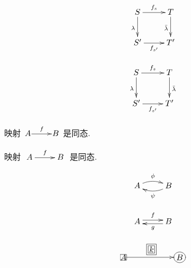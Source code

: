 \documentclass{ctexart}
\begin{document}






\begin{equation}
\begin{gathered}
\xymatrix{
S\ar[r]^{f_s} \ar[d]_{\lambda} & T\ar[d]_{\bar{\lambda}} \\
S'\ar[r]_{f_{s'}} & T' \\
}
\end{gathered}
\end{equation}

\begin{equation}
\begin{gathered}
\xymatrix{
S\ar[r]^{f_s} \ar[d]_{\lambda} & T\ar[d]^{\bar{\lambda}} \\
S'\ar[r]_{f_{s'}} & T' \\
}
\end{gathered}
\end{equation}

映射 $\xymatrix@1{A\ar[r]^{f} & B}$ 是同态.

映射 $\xymatrix{A\ar[r]^{f} & B}$ 是同态.

\[ \xymatrix{
 A \ar@/^/[r]^{\phi} & B \ar@/^/[l]^{\psi}
 } \]

\[ \xymatrix{
  A \ar@<.5ex>[r]^f &
  \ar@<.5ex>[l]^g B
} \]

\[ \xymatrix@=2cm{
  *[F]{A} \ar[r]^*+[F=]{k} & *+[o][F]{B}
} \]

\end{document}
